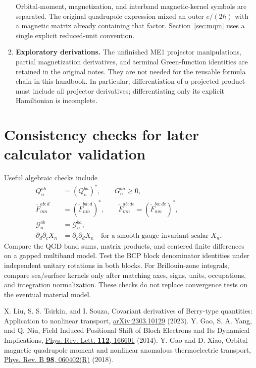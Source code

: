 \documentclass[prx,amsmath,amssymb,superscriptaddress,longbibliography]{revtex4-2}
\begin{document}
\begin{enumerate}
 Orbital-moment, magnetization, and interband magnetic-kernel symbols are separated.
 The original quadrupole expression mixed an outer $e/(2\hbar)$ with a magnetic
 matrix already containing that factor. Section~\ref{sec:mqm} uses a single
 explicit reduced-unit convention.
 \item \textbf{Exploratory derivations.}
 The unfinished ME1 projector manipulations, partial magnetization derivatives,
 and terminal Green-function identities are retained in the original notes.
 They are not needed for the reusable formula chain in this handbook.
 In particular, differentiation of a projected product must include all
 projector derivatives; differentiating only its explicit Hamiltonian is incomplete.
\end{enumerate}

\section{Consistency checks for later calculator validation}
\label{app:checks}
Useful algebraic checks include
\begin{align}
 Q_n^{ab}&=(Q_n^{ba})^*,\qquad G_n^{aa}\ge0,\nonumber\\
 \widetilde F_{mn}^{ab:d}&=(\widetilde F_{nm}^{ba:d})^*,\qquad
 \widetilde F_{mn}^{ab:de}=(\widetilde F_{nm}^{ba:de})^*,\nonumber\\
 \mathcal{G}_n^{ab}&=\mathcal{G}_n^{ba},\nonumber\\
 \partial_d\partial_cX_n&=\partial_c\partial_dX_n
 \quad\text{for a smooth gauge-invariant scalar }X_n.
\end{align}
Compare the QGD band sums, matrix products, and centered finite differences
on a gapped multiband model. Test the BCP block denominator identities under
independent unitary rotations in both blocks.
For Brillouin-zone integrals, compare sea/surface kernels only after matching
axes, signs, units, occupations, and integration normalization.
These checks do not replace convergence tests on the eventual material model.

\begin{thebibliography}{9}
X. Liu, S. S. Tsirkin, and I. Souza,
Covariant derivatives of Berry-type quantities: Application to nonlinear transport,
\href{https://arxiv.org/abs/2303.10129}{arXiv:2303.10129} (2023).
Y. Gao, S. A. Yang, and Q. Niu,
Field Induced Positional Shift of Bloch Electrons and Its Dynamical Implications,
\href{https://doi.org/10.1103/PhysRevLett.112.166601}{Phys. Rev. Lett. \textbf{112}, 166601} (2014).
Y. Gao and D. Xiao,
Orbital magnetic quadrupole moment and nonlinear anomalous thermoelectric transport,
\href{https://doi.org/10.1103/PhysRevB.98.060402}{Phys. Rev. B \textbf{98}, 060402(R)} (2018).
\end{thebibliography}
\end{document}
